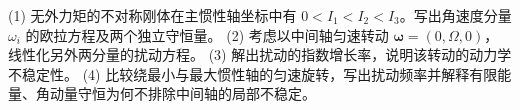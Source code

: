 (1) 无外力矩的不对称刚体在主惯性轴坐标中有 \(0<I_1<I_2<I_3\)。写出角速度分量 \(\omega_i\) 的欧拉方程及两个独立守恒量。
(2) 考虑以中间轴匀速转动 \(\boldsymbol\omega=(0,\Omega,0)\)，线性化另外两分量的扰动方程。
(3) 解出扰动的指数增长率，说明该转动的动力学不稳定性。
(4) 比较绕最小与最大惯性轴的匀速旋转，写出扰动频率并解释有限能量、角动量守恒为何不排除中间轴的局部不稳定。

